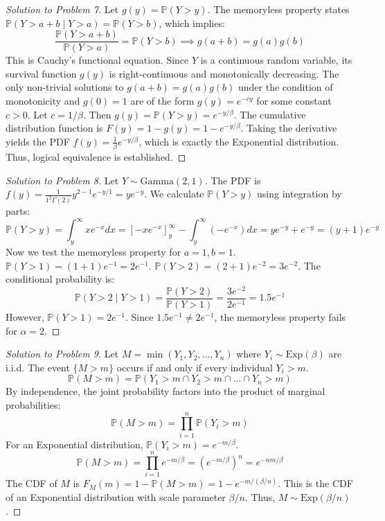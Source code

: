 \documentclass[11pt, a4paper]{article}
\theoremstyle{definition}
\theoremstyle{remark}
\newcommand{\Prob}{\mathbb{P}}
\begin{document}
\begin{proof}[Solution to Problem 7]
Let $g(y) = \Prob(Y > y)$. The memoryless property states $\Prob(Y > a + b \mid Y > a) = \Prob(Y > b)$, which implies:
\[ \frac{\Prob(Y > a + b)}{\Prob(Y > a)} = \Prob(Y > b) \implies g(a+b) = g(a)g(b) \]
This is Cauchy's functional equation. Since $Y$ is a continuous random variable, its survival function $g(y)$ is right-continuous and monotonically decreasing.
The only non-trivial solutions to $g(a+b) = g(a)g(b)$ under the condition of monotonicity and $g(0)=1$ are of the form $g(y) = e^{-cy}$ for some constant $c > 0$.
Let $c = 1/\beta$. Then $g(y) = \Prob(Y > y) = e^{-y/\beta}$.
The cumulative distribution function is $F(y) = 1 - g(y) = 1 - e^{-y/\beta}$. Taking the derivative yields the PDF $f(y) = \frac{1}{\beta} e^{-y/\beta}$, which is exactly the Exponential distribution. Thus, logical equivalence is established.
\end{proof}

\begin{proof}[Solution to Problem 8]
Let $Y \sim \text{Gamma}(2, 1)$. The PDF is $f(y) = \frac{1}{1^2 \Gamma(2)} y^{2-1} e^{-y/1} = y e^{-y}$.
We calculate $\Prob(Y > y)$ using integration by parts:
\[ \Prob(Y > y) = \int_y^\infty x e^{-x} dx = \left[ -x e^{-x} \right]_y^\infty - \int_y^\infty (-e^{-x}) dx = y e^{-y} + e^{-y} = (y+1)e^{-y} \]
Now we test the memoryless property for $a=1, b=1$.
$\Prob(Y > 1) = (1+1)e^{-1} = 2e^{-1}$.
$\Prob(Y > 2) = (2+1)e^{-2} = 3e^{-2}$.
The conditional probability is:
\[ \Prob(Y > 2 \mid Y > 1) = \frac{\Prob(Y > 2)}{\Prob(Y > 1)} = \frac{3e^{-2}}{2e^{-1}} = 1.5 e^{-1} \]
However, $\Prob(Y > 1) = 2e^{-1}$. Since $1.5 e^{-1} \neq 2e^{-1}$, the memoryless property fails for $\alpha = 2$.
\end{proof}

\begin{proof}[Solution to Problem 9]
Let $M = \min(Y_1, Y_2, \dots, Y_n)$ where $Y_i \sim \text{Exp}(\beta)$ are i.i.d.
The event $\{M > m\}$ occurs if and only if every individual $Y_i > m$.
\[ \Prob(M > m) = \Prob(Y_1 > m \cap Y_2 > m \cap \dots \cap Y_n > m) \]
By independence, the joint probability factors into the product of marginal probabilities:
\[ \Prob(M > m) = \prod_{i=1}^n \Prob(Y_i > m) \]
For an Exponential distribution, $\Prob(Y_i > m) = e^{-m/\beta}$.
\[ \Prob(M > m) = \prod_{i=1}^n e^{-m/\beta} = \left( e^{-m/\beta} \right)^n = e^{-nm/\beta} \]
The CDF of $M$ is $F_M(m) = 1 - \Prob(M > m) = 1 - e^{-m/(\beta/n)}$.
This is the CDF of an Exponential distribution with scale parameter $\beta/n$. Thus, $M \sim \text{Exp}(\beta/n)$.
\end{proof}
\end{document}
